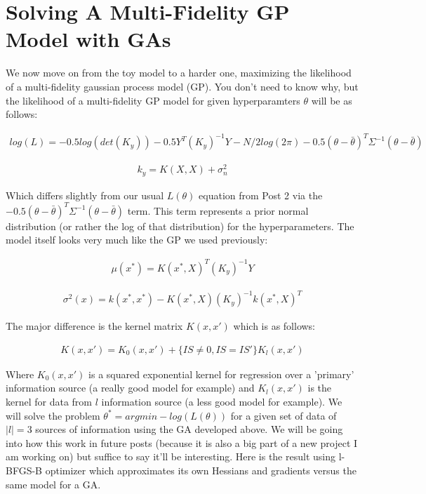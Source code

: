 \documentclass[12pt]{article}
\begin{document}
\section{Solving A Multi-Fidelity GP Model with GAs}

We now move on from the toy model to a harder one, maximizing the likelihood of a multi-fidelity gaussian process model (GP). You don't need to know why, but the likelihood of a multi-fidelity GP model for given hyperparamters $\theta$ will be as follows:

\begin{align*}
log(L)=-0.5log(det(K_y))-0.5Y^T(K_y)^{-1}Y-N/2log(2\pi)-0.5(\theta-\bar{\theta})^T \Sigma^{-1} (\theta-\bar{\theta})
\end{align*}

\begin{align*}
k_y=K(X,X)+\sigma_n^2
\end{align*}

\vspace{5mm}

Which differs slightly from our usual $L(\theta)$ equation from Post 2 via the $-0.5(\theta-\bar{\theta})^T \Sigma^{-1} (\theta-\bar{\theta})$ term. This term represents a prior normal distribution (or rather the log of that distribution) for the hyperparameters. The model itself looks very much like the GP we used previously:

\begin{align*}
\mu(x^*)=K(x^*,X)^T(K_y)^{-1}Y
\end{align*}

\begin{align*}
\sigma^2(x)=k(x^*,x^*) - K(x^*,X)(K_y)^{-1}k(x^*,X)^T
\end{align*}

\vspace{5mm}

The major difference is the kernel matrix $K(x,x')$ which is as follows:

\begin{align*}
K(x,x')=K_0(x,x')+\{IS \neq 0, IS = IS'\}K_l(x,x')
\end{align*}

\vspace{5mm}

Where $K_0(x,x')$ is a squared exponential kernel for regression over a 'primary' information source (a really good model for example) and $K_l(x,x')$ is the kernel for data from $l$ information source (a less good model for example). We will solve the problem $\theta^* = argmin -log(L(\theta))$ for a given set of data of $|l|=3$ sources of information using the GA developed above. We will be going into how this work in future posts (because it is also a big part of a new project I am working on) but suffice to say it'll be interesting. Here is the result using l-BFGS-B optimizer which approximates its own Hessians and gradients versus the same model for a GA.
\end{document}
